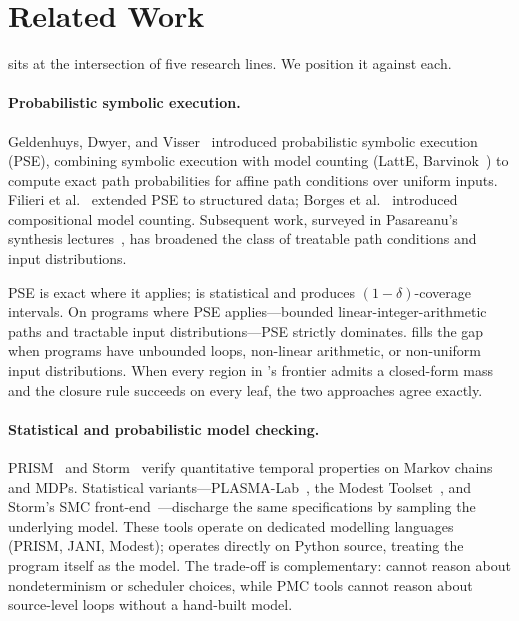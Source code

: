 \section{Related Work}\label{sec:related}

\toolname{} sits at the intersection of five research lines.  We
position it against each.

\paragraph{Probabilistic symbolic execution.}
Geldenhuys, Dwyer, and Visser~\cite{geldenhuys2012pse} introduced
probabilistic symbolic execution (PSE), combining symbolic execution
with model counting (LattE, Barvinok~\cite{koppe2008barvinok}) to
compute exact path probabilities for affine path conditions over
uniform inputs.  Filieri et al.~\cite{filieri2015tacas} extended PSE
to structured data; Borges et al.~\cite{borges2014compositional}
introduced compositional model counting.  Subsequent work, surveyed in
Pasareanu's synthesis lectures~\cite{pasareanu2022lecture}, has
broadened the class of treatable path conditions and input
distributions.

PSE is exact where it applies; \toolname{} is statistical and
produces $(1-\delta)$-coverage intervals.  On programs where PSE
applies---bounded linear-integer-arithmetic paths and tractable input
distributions---PSE strictly dominates.  \toolname{} fills the gap
when programs have unbounded loops, non-linear arithmetic, or
non-uniform input distributions.  When every region in \toolname{}'s
frontier admits a closed-form mass and the closure rule succeeds on
every leaf, the two approaches agree exactly.

\paragraph{Statistical and probabilistic model checking.}
PRISM~\cite{kwiatkowska2011prism} and Storm~\cite{hensel2022storm}
verify quantitative temporal properties on Markov chains and MDPs.
Statistical variants---PLASMA-Lab~\cite{boyer2013plasma}, the Modest
Toolset~\cite{hartmanns2014modest}, and Storm's SMC
front-end~\cite{schoolderman2024storm}---discharge the same
specifications by sampling the underlying model.  These tools operate
on dedicated modelling languages (PRISM, JANI, Modest); \toolname{}
operates directly on Python source, treating the program itself as the
model.  The trade-off is complementary: \toolname{} cannot reason about
nondeterminism or scheduler choices, while PMC tools cannot reason
about source-level loops without a hand-built model.

